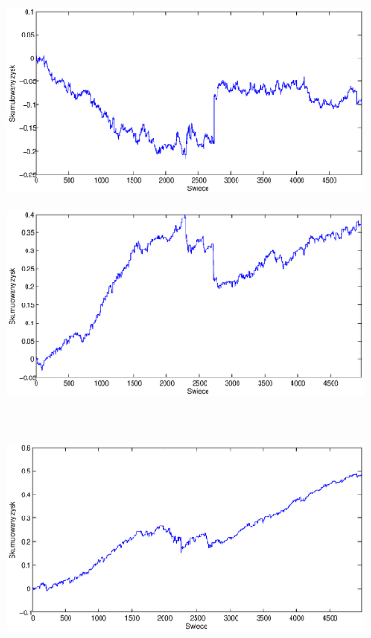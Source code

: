 \begin{figure}[h]
\centering
\begin{minipage}{.49\linewidth}
\centering
\includegraphics[width=0.92\textwidth]{images/S1a_gbpchf.eps}
\label{jedno}
\end{minipage}
\begin{minipage}{.49\linewidth}
\centering
\includegraphics[width=0.92\textwidth]{images/S1b_gbpchf.eps}
\label{dwu}
\end{minipage}
\\
\begin{minipage}{.49\linewidth}
\centering
\includegraphics[width=0.92\textwidth]{images/S1c_gbpchf.eps}

\end{minipage}
\end{figure}
